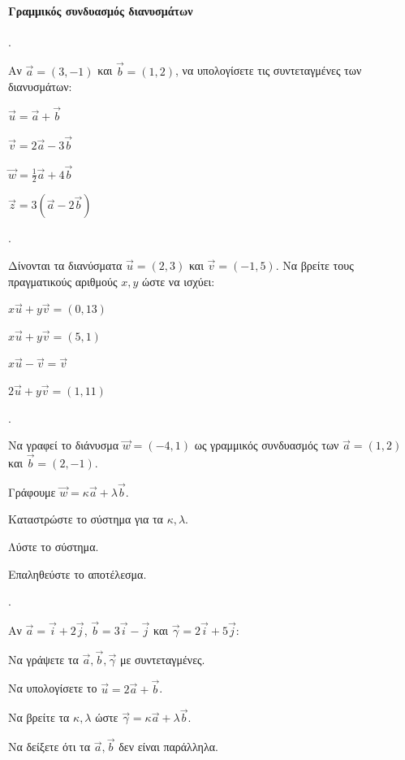 \documentclass[11pt,a4paper,twocolumn]{article}
\newcounter{askhsh}
\newcommand{\askhsh}{\large\theaskhsh.\ \addtocounter{askhsh}{1}}
\begin{document}
\paragraph{Γραμμικός συνδυασμός διανυσμάτων}
\askhsh Αν $\vec{a}=(3, -1)$ και $\vec{b}=(1, 2)$, να υπολογίσετε τις συντεταγμένες των διανυσμάτων:

\begin{alist}
    \item $\vec{u} = \vec{a} + \vec{b}$
    \item $\vec{v} = 2\vec{a} - 3\vec{b}$
    \item $\vec{w} = \frac{1}{2}\vec{a} + 4\vec{b}$
    \item $\vec{z} = 3(\vec{a}-2\vec{b})$
\end{alist}


\askhsh Δίνονται τα διανύσματα $\vec{u}=(2, 3)$ και $\vec{v}=(-1, 5)$. Να βρείτε τους πραγματικούς αριθμούς $x, y$ ώστε να ισχύει:

\begin{alist}
    \item $x\vec{u} + y\vec{v} = (0, 13)$
    \item $x\vec{u} + y\vec{v} = (5, 1)$
    \item $x\vec{u} - \vec{v} = \vec{v}$
    \item $2\vec{u} + y\vec{v} = (1, 11)$
\end{alist}


\askhsh Να γραφεί το διάνυσμα $\vec{w}=(-4, 1)$ ως γραμμικός συνδυασμός των $\vec{a}=(1, 2)$ και $\vec{b}=(2, -1)$.

\begin{alist}
    \item Γράφουμε $\vec{w} = \kappa \vec{a} + \lambda \vec{b}$.
    \item Καταστρώστε το σύστημα για τα $\kappa, \lambda$.
    \item Λύστε το σύστημα.
    \item Επαληθεύστε το αποτέλεσμα.
\end{alist}


\askhsh Αν $\vec{a}=\vec{i}+2\vec{j}$, $\vec{b}=3\vec{i}- \vec{j}$ και $\vec{\gamma}=2\vec{i}+5\vec{j}$:

\begin{alist}
    \item Να γράψετε τα $\vec{a}, \vec{b}, \vec{\gamma}$ με συντεταγμένες.
    \item Να υπολογίσετε το $\vec{u} = 2\vec{a}+\vec{b}$.
    \item Να βρείτε τα $\kappa, \lambda$ ώστε $\vec{\gamma} = \kappa \vec{a} + \lambda \vec{b}$.
    \item Να δείξετε ότι τα $\vec{a}, \vec{b}$ δεν είναι παράλληλα.
\end{alist}
\end{document}
